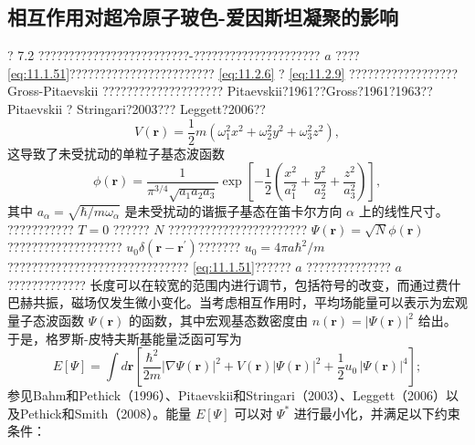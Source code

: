 \subsection{相互作用对超冷原子玻色-爱因斯坦凝聚的影响}\label{ux76f8ux4e92ux4f5cux7528ux5bf9ux8d85ux51b7ux539fux5b50ux73bbux8272ux7231ux56e0ux65afux5766ux51ddux805aux4f53ux7684ux5f71ux54cd}
? 7.2 ?????????????????????????-????????????????????? \(a\) ???? \autoref{eq:11.1.51}???????????????????????? \autoref{eq:11.2.6} ? \autoref{eq:11.2.9} ?????????????????? Gross-Pitaevskii ???????????????????? Pitaevskii?1961??Gross?1961?1963??Pitaevskii ? Stringari?2003??? Leggett?2006??
\begin{equation}\tag{11.2.19}\label{eq:11.2.19}
V ( \pmb { r } ) = \frac { 1 } { 2 } m ( \omega _ { 1 } ^{2} x ^{2} + \omega _ { 2 } ^{2} y ^{2} + \omega _ { 3 } ^{2} z ^{2} ) ,
\end{equation}
这导致了未受扰动的单粒子基态波函数
\begin{equation}\tag{11.2.20}\label{eq:11.2.20}
\phi ( \boldsymbol { r } ) = \frac { 1 } { \pi ^{3 / 4} \sqrt { a _ { 1 } a _ { 2 } a _ { 3 } } } \exp \left[ - \frac { 1 } { 2 } \left( \frac { x ^{2} } { a _ { 1 } ^{2} } + \frac { y ^{2} } { a _ { 2 } ^{2} } + \frac { z ^{2} } { a _ { 3 } ^{2} } \right) \right] ,
\end{equation}
其中 \(a_{\alpha}=\sqrt{\hbar/m\omega_{\alpha}}\) 是未受扰动的谐振子基态在笛卡尔方向 \(\alpha\) 上的线性尺寸。
??????????? \(T=0\) ?????? \(N\) ??????????????????????? \(\Psi(\boldsymbol{r})=\sqrt{N}\phi(\boldsymbol{r})\)??????????????????? \(u_{0}\delta(\boldsymbol{r}-\boldsymbol{r}^{\prime})\)??????? \(u_{0}=4\pi a\hbar^{2}/m\)?????????????????????????????? \autoref{eq:11.1.51}?????? \(a\) ?????????????? \(a\) ?????????????
长度可以在较宽的范围内进行调节，包括符号的改变，而通过费什巴赫共振，磁场仅发生微小变化。当考虑相互作用时，平均场能量可以表示为宏观量子态波函数 \(\Psi(\boldsymbol{r})\) 的函数，其中宏观基态数密度由 \(n(\boldsymbol{r})=|\Psi(\boldsymbol{r})|^{2}\) 给出。于是，格罗斯-皮特夫斯基能量泛函可写为
\begin{equation}\tag{11.2.21}\label{eq:11.2.21}
E [ \Psi ] = \int d \boldsymbol { r } \left[ \frac { \hbar ^{2} } { 2 m } | \nabla \Psi ( \boldsymbol { r } ) | ^{2} + V ( \boldsymbol { r } ) | \Psi ( \boldsymbol { r } ) | ^{2} + \frac { 1 } { 2 } u _ { 0 } \, | \Psi ( \boldsymbol { r } ) | ^{4} \right] ;
\end{equation}
参见Bahm和Pethick（1996）、Pitaevskii和Stringari（2003）、Leggett（2006）以及Pethick和Smith（2008）。能量 \(E[\Psi]\) 可以对 \(\Psi^*\) 进行最小化，并满足以下约束条件：
